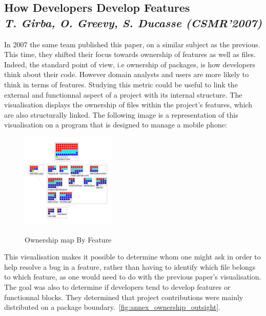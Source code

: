 \subsection{How Developers Develop Features\\ \textit{T. Girba, O. Greevy, S. Ducasse (CSMR'2007)}}

In 2007 the same team published this paper\cite{Girba2007}, on a similar subject as the previous. This time, they shifted their focus towards ownership of features as well as files. Indeed, the standard point of view, i.e ownership of packages, is how developers think about their code. However domain analysts and users are more likely to think in terms of features. Studying this metric could be useful to link the external and functionnal aspect of a project with its internal structure.
The visualisation displays the ownership of files within the project's features, which are also structurally linked. The following image is a representation of this visualisation on a program that is designed to manage a mobile phone:

\begin{figure}[H]
\centering
\includegraphics[width=0.4\textwidth]{./resources/girba2007.png}~
\caption{Ownership map By Feature}
\label{fig:ownership_map_by_feature}
\end{figure}

This visualisation makes it possible to determine whom one might ask in order to help resolve a bug in a feature, rather than having to identify which file belongs to which feature, as one would need to do with the previous paper's visualisation.
The goal was also to determine if developers tend to develop features or functionnal blocks. They determined that project contributions were mainly distributed on a package boundary.~\ref{fig:annex_ownership_outsight}.
